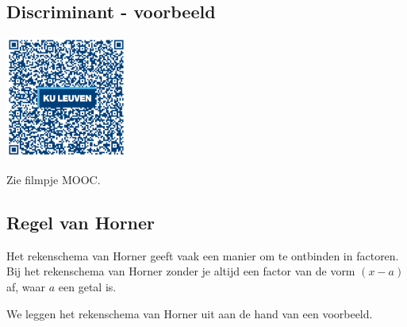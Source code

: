 \subsection{Discriminant - voorbeeld}
\begin{minipage}{.25\linewidth}
	\raggedright
	\includegraphics[width=4cm]{1_elem_rekenvaardigheden_A/inputs/QR_Code_DISCRIMINANT_module1new}
\end{minipage}
\begin{minipage}{.7\linewidth}
	Zie filmpje MOOC.
\end{minipage}

\subsection{Regel van Horner}

\begin{eigenschap}
	Het rekenschema van Horner geeft vaak een manier om te ontbinden in factoren. Bij het rekenschema van Horner zonder je altijd een factor van de vorm $(x-a)$ af, waar $a$ een getal is.
\end{eigenschap}

We leggen het rekenschema van Horner uit aan de hand van een voorbeeld.

